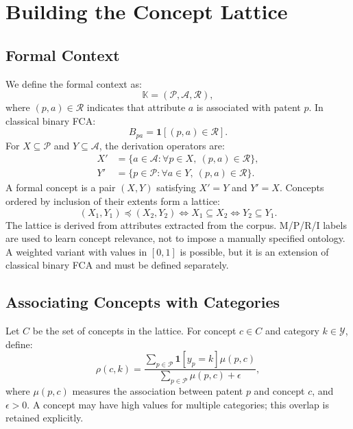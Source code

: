\documentclass[11pt,a4paper]{article}
\begin{document}
\section{Building the Concept Lattice}

\subsection{Formal Context}
We define the formal context as:
\begin{equation}
\mathbb{K}=(\mathcal{P},\mathcal{A},\mathcal{R}),
\end{equation}
where $(p,a)\in\mathcal{R}$ indicates that attribute $a$ is associated with patent $p$. In classical binary FCA:
\begin{equation}
B_{pa}=\mathbf{1}[ (p,a)\in\mathcal{R}].
\end{equation}
For $X\subseteq\mathcal{P}$ and $Y\subseteq\mathcal{A}$, the derivation operators are:
\begin{align}
X'&=\{a\in\mathcal{A}:\forall p\in X,\ (p,a)\in\mathcal{R}\},\\
Y'&=\{p\in\mathcal{P}:\forall a\in Y,\ (p,a)\in\mathcal{R}\}.
\end{align}
A formal concept is a pair $(X,Y)$ satisfying $X'=Y$ and $Y'=X$. Concepts ordered by inclusion of their extents form a lattice:
\begin{equation}
(X_1,Y_1)\preceq(X_2,Y_2)
\iff X_1\subseteq X_2
\iff Y_2\subseteq Y_1.
\end{equation}
The lattice is derived from attributes extracted from the corpus. M/P/R/I labels are used to learn concept relevance, not to impose a manually specified ontology. A weighted variant with values in $[0,1]$ is possible, but it is an extension of classical binary FCA and must be defined separately.

\subsection{Associating Concepts with Categories}
Let $C$ be the set of concepts in the lattice. For concept $c\in C$ and category $k\in\mathcal{Y}$, define:
\begin{equation}
\rho(c,k)=
\frac{\sum_{p\in\mathcal{P}}\mathbf{1}[y_p=k]\mu(p,c)}
{\sum_{p\in\mathcal{P}}\mu(p,c)+\epsilon},
\end{equation}
where $\mu(p,c)$ measures the association between patent $p$ and concept $c$, and $\epsilon>0$. A concept may have high values for multiple categories; this overlap is retained explicitly.
\end{document}
